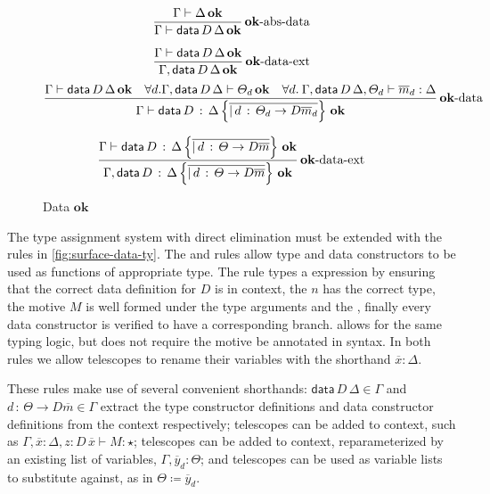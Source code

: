 \begin{figure}
\[
\frac{\Gamma\vdash\Delta\,\mathbf{ok}}{\Gamma\vdash\mathsf{data}\,D\,\Delta\,\mathbf{ok}}\operatorname{\mathbf{ok}-abs-data}
\]

\[
\frac{\Gamma\vdash\mathsf{data}\,D\,\Delta\,\mathbf{ok}}{\Gamma,\mathsf{data}\,D\,\Delta\,\mathbf{ok}}\operatorname{\mathbf{ok}-data-ext}
\]
\[
\frac{\Gamma\vdash\mathsf{data}\,D\,\Delta\,\mathbf{ok}\quad\forall d.\Gamma,\mathsf{data}\,D\,\Delta\vdash\varTheta_{d}\,\mathbf{ok}\quad\forall d.\:\Gamma,\mathsf{data}\,D\,\Delta,\varTheta_{d}\vdash\overline{m}_{d}:\Delta}{\Gamma\vdash\mathsf{data}\,D\,:\,\Delta\left\{ \overline{|\,d\,:\,\varTheta_{d}\rightarrow D\overline{m}_{d}}\right\} \,\mathbf{ok}}\operatorname{\mathbf{ok}-data}
\]

\[
\frac{\Gamma\vdash\mathsf{data}\,D\,:\,\Delta\left\{ \overline{|\,d\,:\,\varTheta\rightarrow D\overline{m}}\right\} \,\mathbf{ok}}{\Gamma,\mathsf{data}\,D\,:\,\Delta\left\{ \overline{|\,d\,:\,\varTheta\rightarrow D\overline{m}}\right\} \,\mathbf{ok}}\operatorname{\mathbf{ok}-data-ext}
\]

\caption{\SLang{} Data $\mathbf{ok}$}
\label{fig:surface-data-ok}
\end{figure}

The type assignment system with direct elimination must be extended with the rules in \ref{fig:surface-data-ty}.
The  and  rules allow type and data constructors to be used as functions of appropriate type.
The  rule types a \case{} expression by ensuring that the correct data definition for $D$ is in context, the \scrut{} $n$ has the correct type, the motive $M$ is well formed under the type arguments and the \scrut{}, %
  finally every data constructor is verified to have a corresponding branch.
 allows for the same typing logic, but does not require the motive be annotated in syntax.
In both rules we allow telescopes to rename their variables with the shorthand $\overline{x}:\Delta$.

These rules make use of several convenient shorthands:
  $\mathsf{data}\,D\,\Delta\in\Gamma$ and $d\,:\,\varTheta\rightarrow D\overline{m}\in\Gamma$ extract the type constructor definitions and data constructor definitions from the context respectively;
  telescopes can be added to context, such as $\Gamma,\overline{x}:\Delta,z:D\,\overline{x}\vdash M:\star$;
  telescopes can be added to context, reparameterized by an existing list of variables, $\Gamma,\overline{y}_{d}:\varTheta$;
  and telescopes can be used as variable lists to substitute against, as in $\varTheta\coloneqq\overline{y}_{d}$.

